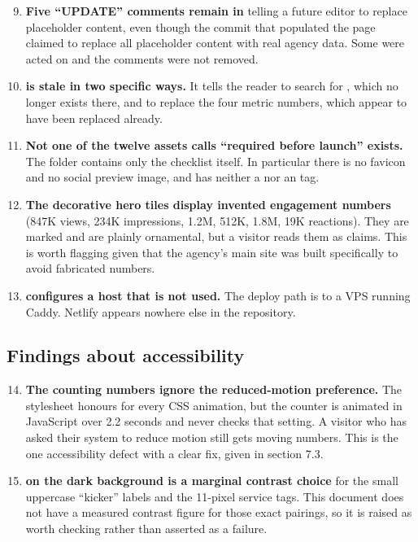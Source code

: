 \documentclass[11pt,a4paper]{article}
\begin{document}
\begin{enumerate}\setcounter{enumi}{8}
\item \textbf{Five ``UPDATE'' comments remain in } telling a
  future editor to replace placeholder content, even though the commit that
  populated the page claimed to replace all placeholder content with real agency
  data. Some were acted on and the comments were not removed.
\item \textbf{ is stale in two specific ways.} It tells the
  reader to search  for , which no longer
  exists there, and to replace the four metric numbers, which appear to have
  been replaced already.
\item \textbf{Not one of the twelve assets  calls
  ``required before launch'' exists.} The  folder contains only the
  checklist itself. In particular there is no favicon and no social preview
  image, and  has neither a  nor an
   tag.
\item \textbf{The decorative hero tiles display invented engagement numbers}
  (847K views, 234K impressions, 1.2M, 512K, 1.8M, 19K reactions). They are marked
   and are plainly ornamental, but a visitor reads them as
  claims. This is worth flagging given that the agency's main site was built
  specifically to avoid fabricated numbers.
\item \textbf{ configures a host that is not used.} The
  deploy path is  to a VPS running Caddy. Netlify appears nowhere
  else in the repository.
\end{enumerate}

\subsection{Findings about accessibility}

\begin{enumerate}\setcounter{enumi}{13}
\item \textbf{The counting numbers ignore the reduced-motion preference.} The
  stylesheet honours  for every CSS animation, but
  the counter is animated in JavaScript over 2.2 seconds and never checks that
  setting. A visitor who has asked their system to reduce motion still gets
  moving numbers. This is the one accessibility defect with a clear fix, given in
  section 7.3.
\item \textbf{ on the dark background is a marginal contrast
  choice} for the small uppercase ``kicker'' labels and the 11-pixel service tags.
  This document does not have a measured contrast figure for those exact pairings,
  so it is raised as worth checking rather than asserted as a failure.
\end{enumerate}
\end{document}
